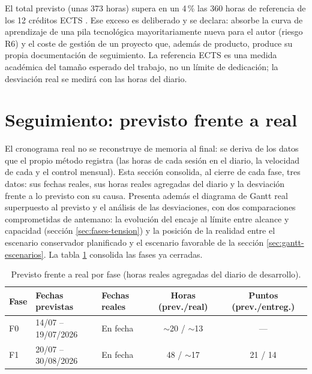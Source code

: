El total previsto (unas 373 horas) supera en un 4\,\% las 360 horas de referencia de los 12 créditos \ac{ECTS} \parencite{rd-1125-2003}.
Ese exceso es deliberado y se declara: absorbe la curva de aprendizaje de una pila tecnológica mayoritariamente nueva para el autor (riesgo R6) y el coste de gestión de un proyecto que, además de producto, produce su propia documentación de seguimiento.
La referencia \ac{ECTS} es una medida académica del tamaño esperado del trabajo, no un límite de dedicación; la desviación real se medirá con las horas del diario.

\section{Seguimiento: previsto frente a real}
\label{sec:gantt-real}

El cronograma real no se reconstruye de memoria al final: se deriva de los datos que el propio método registra (las horas de cada sesión en el diario, la velocidad de cada  y el control mensual).
Esta sección consolida, al cierre de cada fase, tres datos: sus fechas reales, sus horas reales agregadas del diario y la desviación frente a lo previsto con su causa.
Presenta además el diagrama de Gantt real superpuesto al previsto y el análisis de las desviaciones, con dos comparaciones comprometidas de antemano: la evolución del encaje al límite entre alcance y capacidad (sección \ref{sec:fases-tension}) y la posición de la realidad entre el escenario conservador planificado y el escenario favorable de la sección \ref{sec:gantt-escenarios}.
La tabla \ref{tab:previsto-real} consolida las fases ya cerradas.

\begin{table}[htbp]
  \centering
  \small
  \setlength{\tabcolsep}{4pt}
  \caption{Previsto frente a real por fase (horas reales agregadas del diario de desarrollo).}
  \label{tab:previsto-real}
  \begin{tabular}{lllcc}
    \toprule
    \textbf{Fase} & \textbf{Fechas previstas} & \textbf{Fechas reales} & \textbf{Horas (prev./real)} & \textbf{Puntos (prev./entreg.)} \\
    \midrule
    F0 & 14/07 -- 19/07/2026 & En fecha & $\sim$20 / $\sim$13 & --- \\
    F1 & 20/07 -- 30/08/2026 & En fecha & 48 / $\sim$17 & 21 / 14 \\
    \bottomrule
  \end{tabular}
\end{table}

